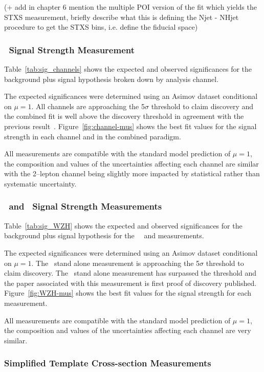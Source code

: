 (+ add in chapter 6 mention the multiple POI version of the fit which yields the
STXS measurement, briefly describe what this is defining the Njet - NHjet
procedure to get the STXS bins, i.e. define the fiducial space)


\subsubsection{\VH\ Signal Strength Measurement}
Table~\ref{tab:sig_channels} shows the expected and observed significances for
the background plus signal hypothesis broken down by analysis channel.

The expected significances were determined using an Asimov dataset conditional
on $\mu=1$. All channels are approaching the 5$\sigma$ threshold to claim
discovery and the combined fit is well above the discovery threshold in
agreement with the previous result~\cite{vhbb-obs}. Figure~\ref{fig:channel-mus}
shows the best fit values for the signal strength in each channel and in the
combined paradigm.

All measurements are compatible with the standard model prediction of $\mu=1$,
the composition and values of the uncertainties affecting each channel are
similar with the 2--lepton channel being slightly more impacted by statistical
rather than systematic uncertainty.
%

\subsubsection{\WH\ and \ZH\ Signal Strength Measurements}
Table~\ref{tab:sig_WZH} shows the expected and observed significances for
the background plus signal hypothesis for the \WH\, \ZH\ and \VH measurements.

The expected significances were determined using an Asimov dataset conditional
on $\mu=1$. The \WH\ stand alone measurement is approaching the 5$\sigma$
threshold to claim discovery. The \ZH\ stand alone measurement has surpassed the
threshold and the paper associated with this measurement is first proof of
discovery published. Figure~\ref{fig:WZH-mus}
shows the best fit values for the signal strength for each measurement.

All measurements are compatible with the standard model prediction of $\mu=1$,
the composition and values of the uncertainties affecting each channel are very
similar.


\subsubsection{Simplified Template Cross-section Measurements}




